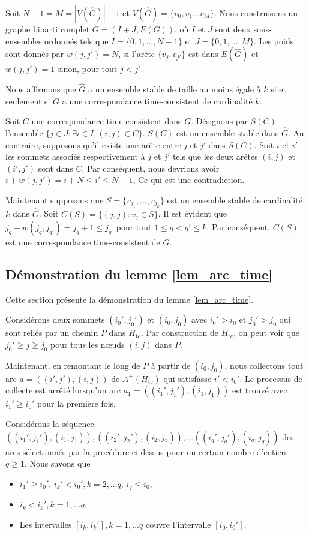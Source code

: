 {{Soit $N-1 = M = |V(\hat{G})|-1$ et $V(\hat{G}) = \{v_0, v_1 \dots v_M \}$. 
Nous construisons un graphe biparti complet $G=(I + J,E(G))$, où $I$ et $J$ sont deux sous-ensembles ordonnés tels que $I=\{0, 1, \dots, N-1\}$ et $J=\{0, 1, \dots, M\}$. 
Les poids sont donnés par $w(j,j')=N$, si l'arête $\{ v_j, v_{j'} \}$ est dans $E(\hat{G})$ et
$w(j,j')= 1$ sinon, pour tout $ j<j'$.

Nous affirmons que $\hat{G}$ a un ensemble stable de taille au moins égale à $k$ si et seulement si $G$ a une correspondance time-consistent de cardinalité $k$.

Soit $C$ une correspondance time-consistent dans $G$. Désignons par $S(C)$ l'ensemble $\{ j \in J: \exists i \in I, (i,j) \in C \}$. $S(C)$ est un ensemble stable dans $\hat{G}$.  Au contraire, supposons qu'il existe une arête entre $j$ et $j'$ dans $S(C)$.
Soit $i$ et $i'$ les sommets associés respectivement à $j$ et $j'$ tels que les deux arêtes $(i,j)$ et $(i',j')$ sont dans $C$. Par conséquent, nous devrions avoir  $i+w(j,j') = i + N   \le i'\leq N-1$, Ce qui est une contradiction. 

Maintenant supposons que $S= \{v_{j_1}, \dots, v_{j_k}\}$ est un ensemble stable de cardinalité $k$ dans $\hat{G}$. 
Soit $C(S)= \{(j,j) : v_j \in S \}$. Il est évident que  $ j_q +  w(j_q,j_{q'}) = j_q+ 1 \leq j_{q'}$
pour tout $1 \leq q < q'  \leq k$. Par conséquent, $C(S)$ est une correspondance time-consistent de $G$.
\subsection{Démonstration du lemme \ref{lem_arc_time}}
\label{lem_arc_time_section}
Cette section présente la démonstration du lemme \ref{lem_arc_time}.


Considérons deux sommets $(i_0', j_0') $ et $(i_0, j_0) $ avec $i_0' > i_0 $ et $j_0' > j_0 $
qui sont reliés par un chemin $P$ dans $H_\textrm{tc}$. Par construction de $H_\textrm{tc}$, on peut voir que $j_0' \geq j \geq  j_0 $ pour tous les nœuds $(i, j)$ dans $P$.

Maintenant, en remontant le long de $P$ à partir de $(i_0, j_0) $, nous collectons tout arc $a= ((i',j'),(i,j))$ de $A^+(H_\textrm{tc})$ qui satisfasse $i' <i_0'$. Le processus de collecte est arrêté lorsqu'un arc $a_1= ((i_1',j_1'),(i_1,j_1))$ est trouvé avec $i_1' \geq i_0'$ pour la première fois.

Considérons la séquence $ ((i_1',j_1'),(i_1,j_1)), ((i_2',j_2'),(i_2,j_2)), \dots ((i_q',j_q'),(i_q,j_q))$
des arcs sélectionnés par la procédure ci-dessus pour un certain nombre d'entiers $q \ge 1$.
Nous savons que
\begin{itemize}[label=$\square$]
	\item  $ i_1' \geq i_0'$, $i_k' < i_0', k=2, \dots q$, $i_q \leq i_0$,
	\item $i_k < i_k', k=1, \dots q$,
	\item  Les intervalles $[i_k,i_k'], k=1, \dots q$ couvre l'intervalle $[i_0,i_0']$.
\end{itemize}

}}
